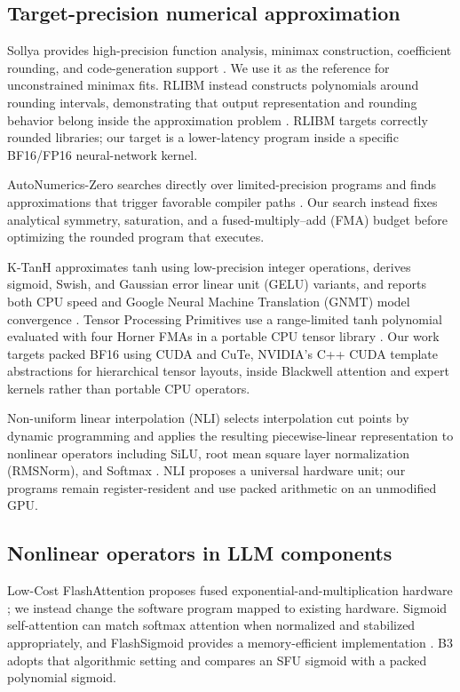 \documentclass[11pt]{article}
\begin{document}
\subsection{Target-precision numerical approximation}

Sollya provides high-precision function analysis, minimax construction,
coefficient rounding, and code-generation support \cite{sollya}. We use it as
the reference for unconstrained minimax fits. RLIBM instead constructs
polynomials around rounding intervals, demonstrating that output
representation and rounding behavior belong inside the approximation problem
\cite{lim2021rlibm32}. RLIBM targets correctly rounded libraries; our target is
a lower-latency program inside a specific BF16/FP16 neural-network kernel.

AutoNumerics-Zero searches directly over limited-precision programs and finds
approximations that trigger favorable compiler paths
\cite{real2023autonumerics}. Our search instead fixes analytical symmetry,
saturation, and a fused-multiply--add (FMA) budget before optimizing the
rounded program that executes.

K-TanH approximates tanh using low-precision integer operations, derives
sigmoid, Swish, and Gaussian error linear unit (GELU) variants, and reports
both CPU speed and Google Neural Machine Translation (GNMT) model convergence
\cite{kundu2019ktanh}. Tensor Processing Primitives use a
range-limited tanh polynomial evaluated with four Horner FMAs in a portable CPU
tensor library \cite{georganas2022tensor}. Our work targets packed BF16 using
CUDA and CuTe, NVIDIA's C++ CUDA template abstractions for hierarchical tensor
layouts, inside Blackwell attention and expert kernels rather than portable CPU
operators.

Non-uniform linear interpolation (NLI) selects interpolation cut points by
dynamic programming and applies the resulting piecewise-linear representation
to nonlinear operators including SiLU, root mean square layer normalization
(RMSNorm), and Softmax
\cite{yu2026nli}. NLI proposes a universal hardware unit; our programs remain
register-resident and use packed arithmetic on an unmodified GPU.

\subsection{Nonlinear operators in LLM components}

Low-Cost FlashAttention proposes fused exponential-and-multiplication hardware
\cite{alexandridis2025lowcostflashattention}; we instead change the software
program mapped to existing hardware. Sigmoid self-attention can match softmax
attention when normalized and stabilized appropriately, and FlashSigmoid
provides a memory-efficient implementation \cite{ramapuram2024sigmoidattention}.
B3 adopts that algorithmic setting and compares an SFU sigmoid with a packed
polynomial sigmoid.
\end{document}
